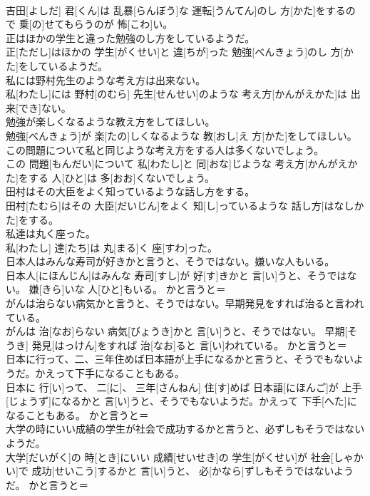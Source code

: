 \documentclass[8pt]{extreport}
\begin{document}
\begin{CJK}{UTF8}{min}
\\	吉田[よしだ] 君[くん]は 乱暴[らんぼう]な 運転[うんてん]のし 方[かた]をするので 乗[の]せてもらうのが 怖[こわ]い。	
\\	正はほかの学生と違った勉強のし方をしているようだ。	
\\	正[ただし]はほかの 学生[がくせい]と 違[ちが]った 勉強[べんきょう]のし 方[かた]をしているようだ。	
\\	私には野村先生のような考え方は出来ない。	
\\	私[わたし]には 野村[のむら] 先生[せんせい]のような 考え方[かんがえかた]は 出来[でき]ない。	
\\	勉強が楽しくなるような教え方をしてほしい。	
\\	勉強[べんきょう]が 楽[たの]しくなるような 教[おし]え 方[かた]をしてほしい。	
\\	この問題について私と同じような考え方をする人は多くないでしょう。	
\\	この 問題[もんだい]について 私[わたし]と 同[おな]じような 考え方[かんがえかた]をする 人[ひと]は 多[おお]くないでしょう。	
\\	田村はその大臣をよく知っているような話し方をする。	
\\	田村[たむら]はその 大臣[だいじん]をよく 知[し]っているような 話し方[はなしかた]をする。	
\\	私達は丸く座った。	
\\	私[わたし] 達[たち]は 丸[まる]く 座[すわ]った。	
\\	日本人はみんな寿司が好きかと言うと、そうではない。嫌いな人もいる。	
\\	日本人[にほんじん]はみんな 寿司[すし]が 好[す]きかと 言[い]うと、そうではない。 嫌[きら]いな 人[ひと]もいる。	かと言うと＝ 
\\	がんは治らない病気かと言うと、そうではない。早期発見をすれば治ると言われている。	
\\	がんは 治[なお]らない 病気[びょうき]かと 言[い]うと、そうではない。 早期[そうき] 発見[はっけん]をすれば 治[なお]ると 言[い]われている。	かと言うと＝ 
\\	日本に行って、二、三年住めば日本語が上手になるかと言うと、そうでもないようだ。かえって下手になることもある。	
\\	日本に 行[い]って、 二[に]、 三年[さんねん] 住[す]めば 日本語[にほんご]が 上手[じょうず]になるかと 言[い]うと、そうでもないようだ。かえって 下手[へた]になることもある。	かと言うと＝ 
\\	大学の時にいい成績の学生が社会で成功するかと言うと、必ずしもそうではないようだ。	
\\	大学[だいがく]の 時[とき]にいい 成績[せいせき]の 学生[がくせい]が 社会[しゃかい]で 成功[せいこう]するかと 言[い]うと、 必[かなら]ずしもそうではないようだ。	かと言うと＝ 

\end{CJK}
\end{document}
